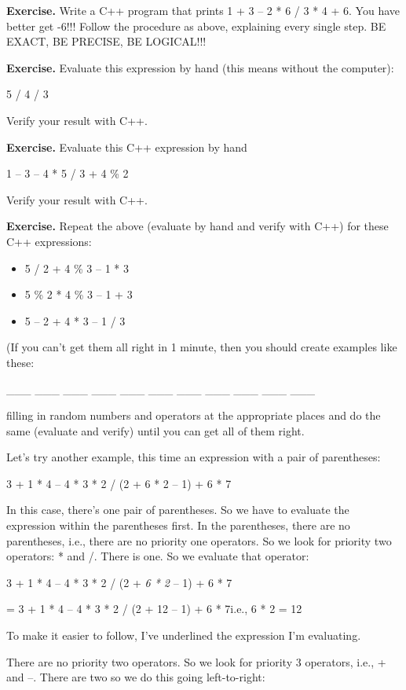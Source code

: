 \documentclass[
]{article}
\providecommand{\tightlist}{%
  \setlength{\itemsep}{0pt}\setlength{\parskip}{0pt}}
\begin{document}
\textbf{Exercise.} Write a C++ program that prints 1 + 3 -- 2 * 6 / 3 *
4 + 6. You have better get -6!!! Follow the procedure as above,
explaining every single step. BE EXACT, BE PRECISE, BE LOGICAL!!!

\textbf{Exercise.} Evaluate this expression by hand (this means without
the computer):

5 / 4 / 3

Verify your result with C++.

\textbf{Exercise.} Evaluate this C++ expression by hand

1 -- 3 -- 4 * 5 / 3 + 4 \% 2

Verify your result with C++.

\textbf{Exercise.} Repeat the above (evaluate by hand and verify with
C++) for these C++ expressions:

\begin{itemize}
\tightlist
\item
  5 / 2 + 4 \% 3 -- 1 * 3
\item
  5 \% 2 * 4 \% 3 -- 1 + 3
\item
  5 -- 2 + 4 * 3 -- 1 / 3
\end{itemize}

(If you can't get them all right in 1 minute, then you should create
examples like these:

\_\_\_ \_\_\_ \_\_\_ \_\_\_ \_\_\_ \_\_\_ \_\_\_ \_\_\_ \_\_\_ \_\_\_
\_\_\_

filling in random numbers and operators at the appropriate places and do
the same (evaluate and verify) until you can get all of them right.

Let's try another example, this time an expression with a pair of
parentheses:

3 + 1 * 4 -- 4 * 3 * 2 / (2 + 6 * 2 -- 1) + 6 * 7

In this case, there's one pair of parentheses. So we have to evaluate
the expression within the parentheses first. In the parentheses, there
are no parentheses, i.e., there are no priority one operators. So we
look for priority two operators: * and /. There is one. So we evaluate
that operator:

3 + 1 * 4 -- 4 * 3 * 2 / (2 + \emph{6 * 2} -- 1) + 6 * 7

= 3 + 1 * 4 -- 4 * 3 * 2 / (2 + 12 -- 1) + 6 * 7i.e., 6 * 2 = 12

To make it easier to follow, I've underlined the expression I'm
evaluating.

There are no priority two operators. So we look for priority 3
operators, i.e., + and --. There are two so we do this going
left-to-right:
\end{document}
